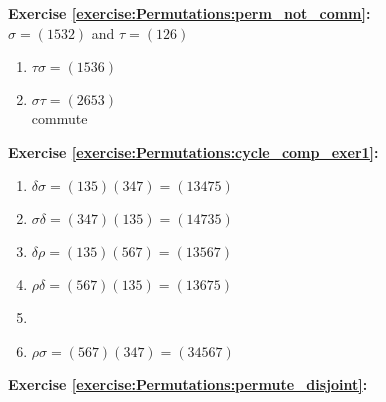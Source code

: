 \noindent\textbf{Exercise \ref{exercise:Permutations:perm_not_comm}:}\\
$\sigma = (1532)$ and $\tau = (126)$
\begin{enumerate}[{a.}]
\item
$\tau\sigma = (1536)$

\item
$\sigma\tau = (2653)$\\
commute
\end{enumerate}

\noindent\textbf{Exercise \ref{exercise:Permutations:cycle_comp_exer1}:}
\begin{multicols}{2}
\begin{enumerate}[{a.}]
\item
$\delta \sigma = (135)(347) = (13475)$

\item
$\sigma \delta = (347)(135) = (14735)$

\item
$\delta \rho = (135)(567) = (13567)$

\item
$\rho \delta = (567)(135) = (13675)$

\item

\item
$\rho \sigma = (567)(347) = (34567)$
\end{enumerate}
\end{multicols}

\noindent\textbf{Exercise \ref{exercise:Permutations:permute_disjoint}:}\\


